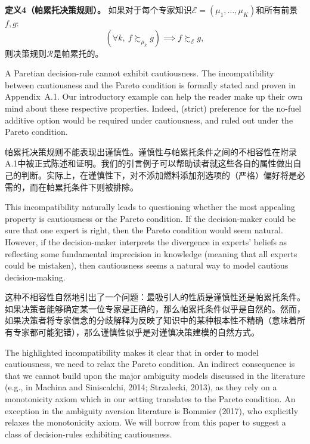 \documentclass[12pt,a4paper]{article}
\newenvironment{original}
  {\par\noindent\ignorespaces}
  {\par}
\newenvironment{translation}
  {\par\noindent{\color{transblue}\ignorespaces}}
  {\par\medskip}
\begin{document}
\begin{translation}
\textbf{定义4（帕累托决策规则）。} 如果对于每个专家知识$\mathcal{E} = (\mu_{1}, \dots, \mu_{K})$和所有前景$f, g$:
\[
(\forall k,\ f \succsim_{\mu_{k}} g) \implies f \succsim_{\mathcal{E}} g,
\]
则决策规则$\mathcal{R}$是帕累托的。
\end{translation}

\begin{original}
A Paretian decision-rule cannot exhibit cautiousness. The incompatibility between cautiousness and the Pareto condition is formally stated and proven in Appendix~A.1. Our introductory example can help the reader make up their own mind about these respective properties. Indeed, (strict) preference for the no-fuel additive option would be required under cautiousness, and ruled out under the Pareto condition.
\end{original}

\begin{translation}
帕累托决策规则不能表现出谨慎性。谨慎性与帕累托条件之间的不相容性在附录A.1中被正式陈述和证明。我们的引言例子可以帮助读者就这些各自的属性做出自己的判断。实际上，在谨慎性下，对不添加燃料添加剂选项的（严格）偏好将是必需的，而在帕累托条件下则被排除。
\end{translation}

\begin{original}
This incompatibility naturally leads to questioning whether the most appealing property is cautiousness or the Pareto condition. If the decision-maker could be sure that one expert is right, then the Pareto condition would seem natural. However, if the decision-maker interprets the divergence in experts' beliefs as reflecting some fundamental imprecision in knowledge (meaning that all experts could be mistaken), then cautiousness seems a natural way to model cautious decision-making.
\end{original}

\begin{translation}
这种不相容性自然地引出了一个问题：最吸引人的性质是谨慎性还是帕累托条件。如果决策者能够确定某一位专家是正确的，那么帕累托条件似乎是自然的。然而，如果决策者将专家信念的分歧解释为反映了知识中的某种根本性不精确（意味着所有专家都可能犯错），那么谨慎性似乎是对谨慎决策建模的自然方式。
\end{translation}

\begin{original}
The highlighted incompatibility makes it clear that in order to model cautiousness, we need to relax the Pareto condition. An indirect consequence is that we cannot build upon the major ambiguity models discussed in the literature (e.g., in Machina and Siniscalchi, 2014; Strzalecki, 2013), as they rely on a monotonicity axiom which in our setting translates to the Pareto condition. An exception in the ambiguity aversion literature is Bommier (2017), who explicitly relaxes the monotonicity axiom. We will borrow from this paper to suggest a class of decision-rules exhibiting cautiousness.
\end{original}
\end{document}
